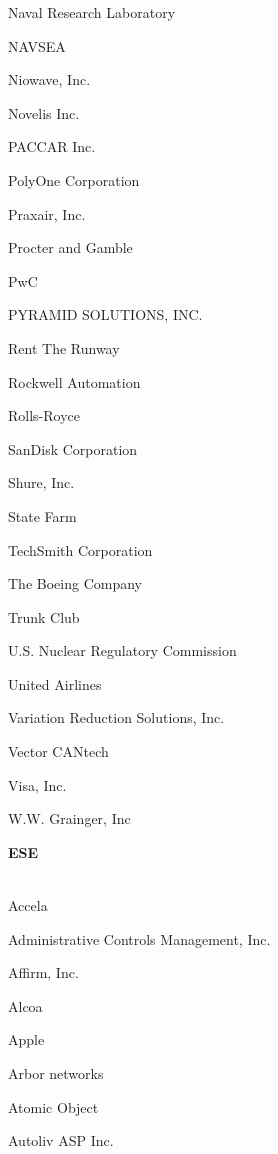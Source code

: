 \documentclass[twoside]{article}
\begin{document}
\begin{center}
\begin{multicols}{5}
\begin{FlushLeft}
\begin{compactitem}
\item Naval Research Laboratory
\item NAVSEA
\item Niowave, Inc.
\item Novelis Inc.
\item PACCAR Inc.
\item PolyOne Corporation
\item Praxair, Inc.
\item Procter and Gamble
\item PwC
\item PYRAMID SOLUTIONS, INC.
\item Rent The Runway
\item Rockwell Automation
\item Rolls-Royce
\item SanDisk Corporation
\item Shure, Inc.
\item State Farm
\item TechSmith Corporation
\item The Boeing Company
\item Trunk Club
\item U.S. Nuclear Regulatory Commission
\item United Airlines
\item Variation Reduction Solutions, Inc.
\item Vector CANtech
\item Visa, Inc.
\item W.W. Grainger, Inc
\end{compactitem}
        \end{FlushLeft}
        \vspace{1em}
        {\fontsize{14}{16}\selectfont \bf ESE}\\
        \vspace{-1em}
        ~\hrulefill~
        \vspace{-.9em}
        \begin{FlushLeft}
        \begin{compactitem}
        \item Accela
\item Administrative Controls Management, Inc.
\item Affirm, Inc.
\item Alcoa
\item Apple
\item Arbor networks
\item Atomic Object
\item Autoliv ASP Inc.

\end{compactitem}
\end{FlushLeft}
\end{multicols}
\end{center}
\end{document}
